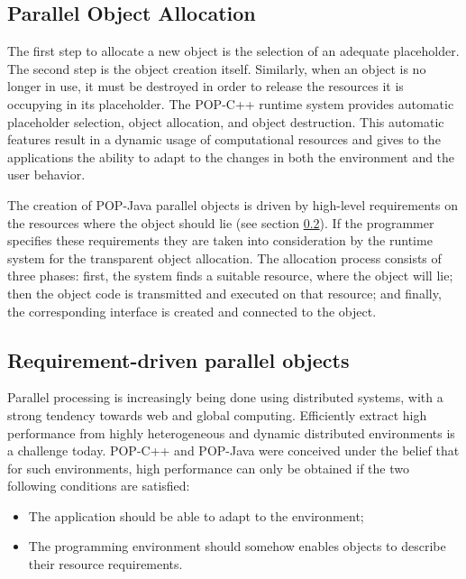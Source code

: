 \subsection{Parallel Object Allocation}
\label{allocation}
The first step to allocate a new object is the selection of an adequate
placeholder. The second step is the object creation itself. Similarly,
when an object is no longer in use, it must be destroyed in order to
release the resources it is occupying in its placeholder. The POP-C++
runtime system provides automatic placeholder selection, object
allocation, and object destruction. This automatic features result in a
dynamic usage of computational resources and gives to the applications
the ability to adapt to the changes in both the environment and the user
behavior.\s

The creation of POP-Java parallel objects is driven by high-level
requirements on the resources where the object should lie (see section
\ref{requirement}). If the programmer specifies these requirements
they are taken into consideration by the runtime system for the transparent 
object allocation. The allocation process consists of three phases: first, the system finds a suitable resource, where the
object will lie; then the object code is transmitted and executed on
that resource; and finally, the corresponding interface is created and
connected to the object.


\subsection{Requirement-driven parallel objects}
\label{requirement}
Parallel processing is increasingly being done using distributed
systems, with a strong tendency towards web and global computing.
Efficiently extract high performance from highly heterogeneous and
dynamic distributed environments is a challenge today. POP-C++ and POP-Java were
conceived under the belief that for such environments, high performance
can only be obtained if the two following conditions are satisfied:

\begin{itemize}

\item The application should be able to adapt to the environment;

\item The programming environment should somehow enables objects
to describe their resource requirements.

\end{itemize}

